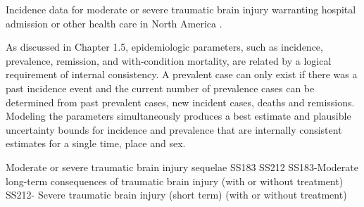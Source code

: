Incidence data for moderate or severe traumatic brain injury warranting hospital admission or other health care in North America .

As discussed in Chapter 1.5, epidemiologic parameters, such as incidence, prevalence, remission, and with-condition mortality, are related by a logical requirement of internal consistency.  A prevalent case can only exist if there was a past incidence event and the current number of prevalence cases can be determined from past prevalent cases, new incident cases, deaths and remissions.  Modeling the parameters simultaneously produces a best estimate and plausible uncertainty bounds for incidence and prevalence that are internally consistent estimates for a single time, place and sex.


Moderate or severe traumatic brain injury sequelae SS183 SS212
SS183-Moderate long-term consequences of traumatic brain injury (with or without treatment)
SS212- Severe traumatic brain injury (short term) (with or without treatment)

